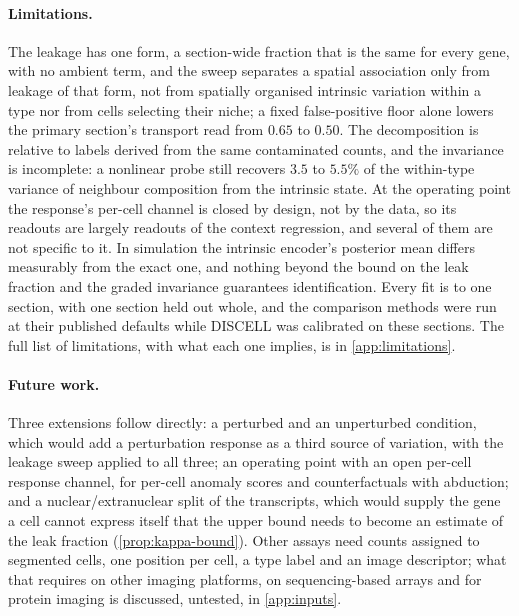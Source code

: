 \paragraph{Limitations.}
The leakage has one form, a section-wide fraction that is the same for every gene, with no ambient term, and the sweep separates a spatial association only from leakage of that form, not from spatially organised intrinsic variation within a type nor from cells selecting their niche; a fixed false-positive floor alone lowers the primary section's transport read from $0.65$ to $0.50$. The decomposition is relative to labels derived from the same contaminated counts, and the invariance is incomplete: a nonlinear probe still recovers $3.5$ to $5.5\%$ of the within-type variance of neighbour composition from the intrinsic state. At the operating point the response's per-cell channel is closed by design, not by the data, so its readouts are largely readouts of the context regression, and several of them are not specific to it. In simulation the intrinsic encoder's posterior mean differs measurably from the exact one, and nothing beyond the bound on the leak fraction and the graded invariance guarantees identification. Every fit is to one section, with one section held out whole, and the comparison methods were run at their published defaults while DISCELL was calibrated on these sections. The full list of limitations, with what each one implies, is in \cref{app:limitations}.

\paragraph{Future work.}
Three extensions follow directly: a perturbed and an unperturbed condition, which would add a perturbation response as a third source of variation, with the leakage sweep applied to all three; an operating point with an open per-cell response channel, for per-cell anomaly scores and counterfactuals with abduction; and a nuclear/extranuclear split of the transcripts, which would supply the gene a cell cannot express itself that the upper bound needs to become an estimate of the leak fraction (\cref{prop:kappa-bound}). Other assays need counts assigned to segmented cells, one position per cell, a type label and an image descriptor; what that requires on other imaging platforms, on sequencing-based arrays and for protein imaging is discussed, untested, in \cref{app:inputs}.

